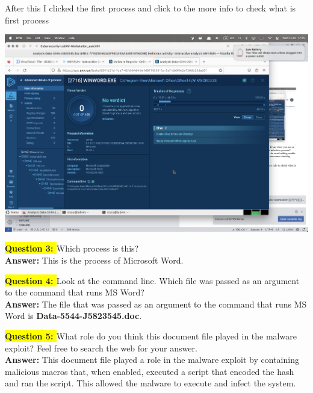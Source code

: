 \documentclass{article}
\begin{document}
\vspace{1\baselineskip}

\newpage

After this I clicked the first process and click to the more info to check what is first process

\vspace{1\baselineskip}

\includegraphics[width=1\textwidth]{10.png}

\vspace{1\baselineskip}

\textbf{\colorbox{yellow}{Question 3: }} Which process is this? \\
\textbf{Answer: } This is the process of Microsoft Word. \\

\vspace{1\baselineskip}

\textbf{\colorbox{yellow}{Question 4: }} Look at the command line. Which file was passed as an argument to the command that runs MS Word? \\
\textbf{Answer: } The file that was passed as an argument to the command that runs MS Word is \textbf{Data-5544-J5823545.doc}. \\

\vspace{1\baselineskip}

\textbf{\colorbox{yellow}{Question 5: }} What role do you think this document file played in the malware exploit? Feel free to search the web for your answer. \\
\textbf{Answer: } This document file played a role in the malware exploit by containing malicious macros that, when enabled, executed a script that encoded the hash and ran the script. This allowed the malware to execute and infect the system. \\
\end{document}
